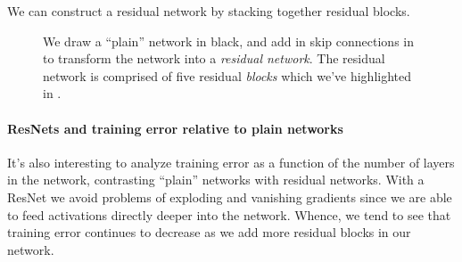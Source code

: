 \documentclass[12pt]{article}
\begin{document}
We can construct a residual network by stacking together residual blocks.

\begin{figure}[h!]   \centering
  \caption{\footnotesize We draw a ``plain'' network in black, and add in skip connections in {\color{orange}{orange}} to transform the network into a \emph{residual network}. The residual network is comprised of five residual \emph{blocks} which we've highlighted in {\color{purple}{purple}}.} \end{figure}

\paragraph{ResNets and training error relative to plain networks}
It's also interesting to analyze training error as a function of the number of layers in the network, contrasting 
``plain'' networks with residual networks.
With a ResNet we avoid problems of exploding and vanishing gradients since we are able to feed activations directly
deeper into the network. Whence, we tend to see that training error continues to decrease as we add more residual 
blocks in our network.

\begin{figure}[h!]
\centering
{}
\end{figure}
\end{document}
